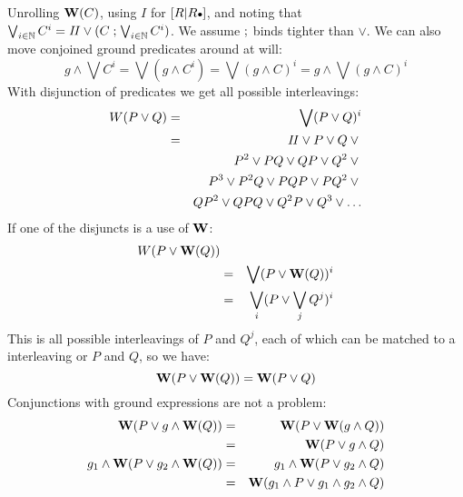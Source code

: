 Unrolling $\mathbf{W}(C)$, using $I$ for $[R|R{\scriptstyle{\bullet}}]$,
and noting that
$
\bigvee_{i \in \mathbb{N}} C^i
= \mathit{II} \lor (C\mathrel{;}\bigvee_{i \in \mathbb{N}} C^i)
$.
We assume $\mathrel{;}$ binds tighter than $\lor$.
We can also move conjoined ground predicates around at will:
\begin{equation}
  g \land \bigvee C^i
= \bigvee (g \land C^i)
= \bigvee (g \land C)^i
= g \land \bigvee (g \land C)^i
\end{equation}
With disjunction of predicates we get all possible interleavings:
\begin{eqnarray*}
      W(P \lor Q)
  &=& \bigvee (P \lor Q)^i
\\&=& \mathit{II} \lor P \lor Q \lor {}
\\& & P^2 \lor PQ \lor QP \lor Q^2 \lor {}
\\& & P^3 \lor P^2Q \lor PQP \lor PQ^2 \lor {}
\\& & QP^2 \lor QPQ \lor Q^2P \lor Q^3 \lor \dots
\end{eqnarray*}
If one of the disjuncts is a use of $\mathbf{W}$:
\begin{eqnarray*}
      W(P \lor \mathbf{W}(Q))
\\&=& \bigvee (P \lor \mathbf{W}(Q))^i
\\&=& \bigvee_i (P \lor \bigvee_j Q^j)^i
\end{eqnarray*}
This is all possible interleavings of $P$ and $Q^j$,
each of which can be matched to a interleaving or $P$ and $Q$,
so we have:
\begin{equation}
   \mathbf{W}(P \lor \mathbf{W}(Q)) = \mathbf{W}(P \lor Q)
\end{equation}
Conjunctions with ground expressions are not a problem:
\begin{eqnarray*}
   \mathbf{W}(P \lor g \land \mathbf{W}(Q)) &=& \mathbf{W}(P \lor \mathbf{W}(g \land Q))
\\ &=& \mathbf{W}(P \lor g \land Q)
\\ g_1 \land \mathbf{W}(P \lor g_2 \land \mathbf{W}(Q))
   &=& g_1 \land \mathbf{W}(P \lor g_2 \land Q)
\\ &=& \mathbf{W}(g_1 \land P \lor g_1 \land g_2 \land Q)
\end{eqnarray*}

